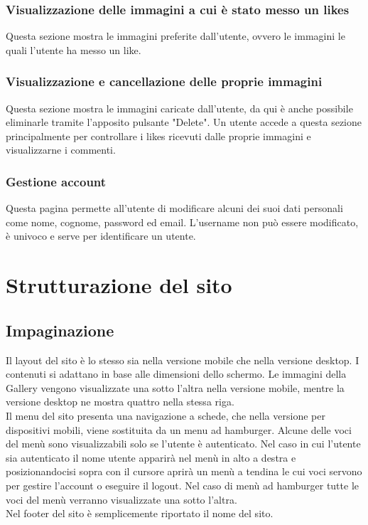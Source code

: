 \documentclass[openany, a4paper, 12pt]{report}
\begin{document}
		\subsubsection{Visualizzazione delle immagini a cui è stato messo un likes}
		Questa sezione mostra le immagini preferite dall'utente, ovvero le immagini le quali l'utente ha messo un like.
		
		\subsubsection{Visualizzazione e cancellazione delle proprie immagini}
		Questa sezione mostra le immagini caricate dall'utente, da qui è anche possibile eliminarle tramite l'apposito pulsante "Delete". Un utente accede a questa sezione principalmente per controllare i likes ricevuti dalle proprie immagini e visualizzarne i commenti.
		
		\subsubsection{Gestione account}
		Questa pagina permette all'utente di modificare alcuni dei suoi dati personali come nome, cognome, password ed email. L'username non può essere modificato, è univoco e serve per identificare un utente.

	\section{Strutturazione del sito}
		\subsection{Impaginazione}
		Il layout del sito è lo stesso sia nella versione mobile che nella versione desktop. I contenuti si adattano in base alle dimensioni dello schermo. Le immagini della Gallery vengono visualizzate una sotto l'altra nella versione mobile, mentre la versione desktop ne mostra quattro nella stessa riga.\\
		Il menu del sito presenta una navigazione a schede, che nella versione per dispositivi mobili, viene sostituita da un menu ad hamburger. Alcune delle voci del menù sono visualizzabili solo se l'utente è autenticato. Nel caso in cui l'utente sia autenticato il nome utente apparirà nel menù in alto a destra e posizionandocisi sopra con il cursore aprirà un menù a tendina le cui voci servono per gestire l'account o eseguire il logout. Nel caso di menù ad hamburger tutte le voci del menù verranno visualizzate una sotto l'altra.\\
		Nel footer del sito è semplicemente riportato il nome del sito.
\end{document}
